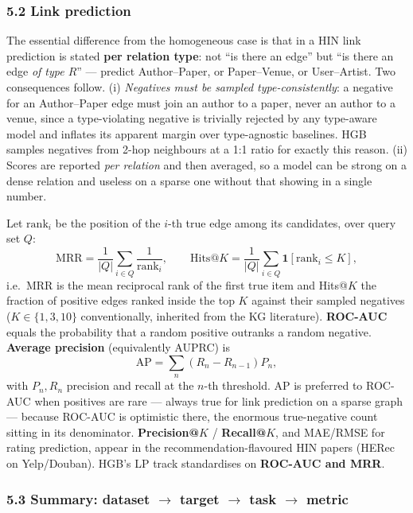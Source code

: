 \subsubsection*{5.2 Link prediction}

The essential difference from the homogeneous case is that in a HIN link prediction is stated
\textbf{per relation type}: not ``is there an edge'' but ``is there an edge \emph{of type $R$}''
--- predict Author--Paper, or Paper--Venue, or User--Artist. Two consequences follow.
(i) \emph{Negatives must be sampled type-consistently}: a negative for an Author--Paper edge must
join an author to a paper, never an author to a venue, since a type-violating negative is trivially
rejected by any type-aware model and inflates its apparent margin over type-agnostic baselines.
HGB samples negatives from 2-hop neighbours at a 1:1 ratio for exactly this reason.
(ii) Scores are reported \emph{per relation} and then averaged, so a model can be strong on a dense
relation and useless on a sparse one without that showing in a single number.

Let $\mathrm{rank}_i$ be the position of the $i$-th true edge among its candidates, over query set
$Q$:
\[
  \mathrm{MRR}=\frac{1}{|Q|}\sum_{i\in Q}\frac{1}{\mathrm{rank}_i},
  \qquad
  \mathrm{Hits}@K=\frac{1}{|Q|}\sum_{i\in Q}\mathbf{1}\!\left[\mathrm{rank}_i\le K\right],
\]
i.e.\ MRR is the mean reciprocal rank of the first true item and Hits@$K$ the fraction of positive
edges ranked inside the top $K$ against their sampled negatives ($K\in\{1,3,10\}$ conventionally,
inherited from the KG literature). \textbf{ROC-AUC} equals the probability that a random positive
outranks a random negative. \textbf{Average precision} (equivalently AUPRC) is
\[
  \mathrm{AP}=\sum_{n}\left(R_n-R_{n-1}\right)P_n ,
\]
with $P_n,R_n$ precision and recall at the $n$-th threshold. AP is preferred to ROC-AUC when
positives are rare --- always true for link prediction on a sparse graph --- because ROC-AUC is
optimistic there, the enormous true-negative count sitting in its denominator.
\textbf{Precision@$K$} / \textbf{Recall@$K$}, and MAE/RMSE for rating prediction, appear in the
recommendation-flavoured HIN papers (HERec on Yelp/Douban). HGB's LP track standardises on
\textbf{ROC-AUC and MRR}.

\subsubsection*{5.3 Summary: dataset $\to$ target $\to$ task $\to$ metric}

